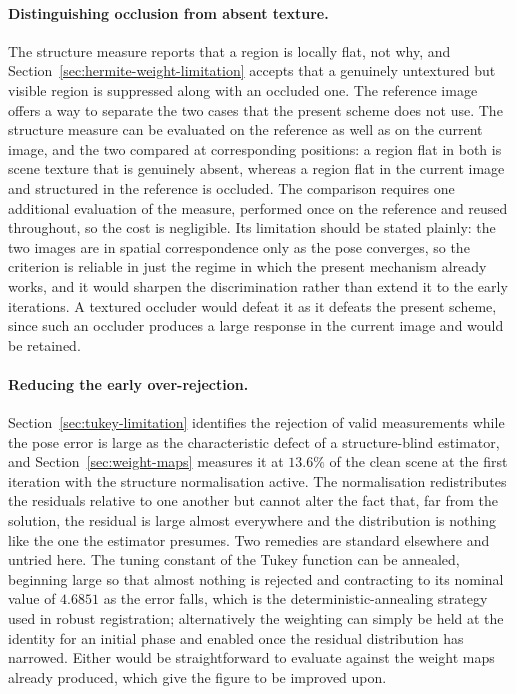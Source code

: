 \paragraph{Distinguishing occlusion from absent texture.}
The structure measure reports that a region is locally flat, not why, and
Section~\ref{sec:hermite-weight-limitation} accepts that a genuinely
untextured but visible region is suppressed along with an occluded one. The
reference image offers a way to separate the two cases that the present scheme
does not use. The structure measure can be evaluated on the reference as well
as on the current image, and the two compared at corresponding positions: a
region flat in both is scene texture that is genuinely absent, whereas a
region flat in the current image and structured in the reference is occluded.
The comparison requires one additional evaluation of the measure, performed
once on the reference and reused throughout, so the cost is negligible. Its
limitation should be stated plainly: the two images are in spatial
correspondence only as the pose converges, so the criterion is reliable in
just the regime in which the present mechanism already works, and it would
sharpen the discrimination rather than extend it to the early iterations. A
textured occluder would defeat it as it defeats the present scheme, since such
an occluder produces a large response in the current image and would be
retained.

\paragraph{Reducing the early over-rejection.}
Section~\ref{sec:tukey-limitation} identifies the rejection of valid
measurements while the pose error is large as the characteristic defect of a
structure-blind estimator, and Section~\ref{sec:weight-maps} measures it at
$13.6\%$ of the clean scene at the first iteration with the structure
normalisation active. The normalisation redistributes the residuals relative
to one another but cannot alter the fact that, far from the solution, the
residual is large almost everywhere and the distribution is nothing like the
one the estimator presumes. Two remedies are standard elsewhere and untried
here. The tuning constant of the Tukey function can be annealed, beginning
large so that almost nothing is rejected and contracting to its nominal value
of $4.6851$ as the error falls, which is the deterministic-annealing strategy
used in robust registration; alternatively the weighting can simply be held at
the identity for an initial phase and enabled once the residual distribution
has narrowed. Either would be straightforward to evaluate against the weight
maps already produced, which give the figure to be improved upon.

